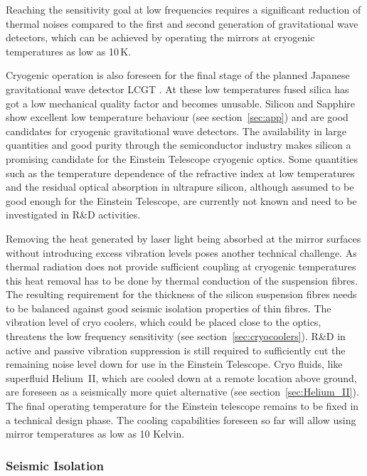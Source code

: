 Reaching the sensitivity goal at low frequencies requires a significant reduction of thermal noises compared to the first and second generation of gravitational wave detectors, which can be achieved by operating the mirrors at cryogenic temperatures as low as 10\,K.  

Cryogenic operation is also foreseen for the final stage of the planned Japanese gravitational wave detector LCGT . At these low temperatures fused silica has got a low mechanical quality factor and becomes unusable. Silicon and Sapphire show excellent low temperature behaviour (see section~\ref{sec:app}) and are good candidates for cryogenic gravitational wave detectors. The availability in large quantities and good purity through the semiconductor industry makes silicon a promising candidate for the Einstein Telescope cryogenic optics. Some quantities such as the temperature dependence of the refractive index at low temperatures and the residual optical absorption in ultrapure silicon, although assumed to be good enough for the Einstein Telescope, are currently not known and need to be investigated in R\&D activities.

Removing the heat generated by laser light being absorbed at the mirror surfaces without introducing excess vibration levels poses another technical challenge. As thermal radiation does not provide sufficient coupling at cryogenic temperatures this heat removal has to be done by thermal conduction of the suspension fibres. The resulting requirement for the thickness of the silicon suspension fibres needs to be balanced against good seismic isolation properties of thin fibres. The vibration level of cryo coolers, which could be placed close to the optics, threatens the low frequency sensitivity (see section~\ref{sec:cryocoolers}). R\&D in active and passive vibration suppression is still required to sufficiently cut the remaining noise level down for use in the Einstein Telescope. Cryo fluids, like superfluid Helium~II, which are cooled down at a remote location above ground, are foreseen as a seismically more quiet alternative (see section~\ref{sec:Helium_II}). The final operating temperature for the Einstein telescope remains to be fixed in a technical design phase. The cooling capabilities foreseen so far will allow using mirror temperatures as low as 10 Kelvin.

\subsubsection{Seismic Isolation}

